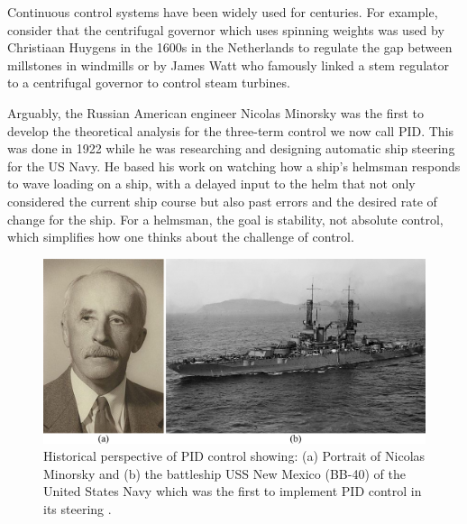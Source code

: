 \documentclass[12pt,letter]{article}
\begin{document}
\begin{review}
	\label{sec:control_systems_review}
	
		Continuous control systems have been widely used for centuries. For example, consider that the centrifugal governor which uses spinning weights was used by Christiaan Huygens in the 1600s in the Netherlands to regulate the gap between millstones in windmills or by James Watt who famously linked a stem regulator to a centrifugal governor to control steam turbines. 

		Arguably, the Russian American engineer Nicolas Minorsky was the first to develop the theoretical analysis for the three-term control we now call PID. This was done in 1922 while he was researching and designing automatic ship steering for the US Navy. He based his work on watching how a ship's helmsman responds to wave loading on a ship, with a delayed input to the helm that not only considered the current ship course but also past errors and the desired rate of change for the ship. For a helmsman, the goal is stability, not absolute control, which simplifies how one thinks about the challenge of control.
		
	\begin{figure}[H]
		\centering
		\includegraphics[width=6in]{../figures/PID_Nicolas_Minorsky_and_USS_New_Mexico}
		\caption{Historical perspective of PID control showing: (a) Portrait of Nicolas Minorsky \protect\footnotemark[1] and (b) the battleship USS New Mexico (BB-40) of the United States Navy which was the first to implement PID control in its steering \protect\footnotemark[2]. }
		\label{fig:fragility_curve}
	\end{figure}

	
\end{review}
\end{document}
